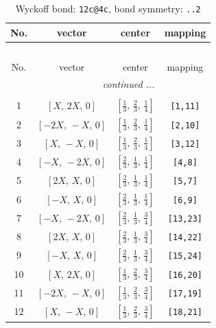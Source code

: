 \documentclass[fleqn,8pt]{jsarticle}
\begin{document}
\renewcommand{\arraystretch}{1.2}
\begin{longtable}{cccc}
\caption{Wyckoff bond: {\tt 12c@4c}, bond symmetry: {\tt ..2}}
 \\
 \hline \hline
No. & vector & center & mapping \\ \hline \endfirsthead

\multicolumn{3}{l}{\tablename\ \thetable{}} \\
 \hline \hline
No. & vector & center & mapping \\ \hline \endhead

 \hline \hline
\multicolumn{3}{r}{\footnotesize\it continued ...} \\ \endfoot

 \hline \hline
\multicolumn{3}{r}{} \\ \endlastfoot

1 & $\left[ X,\, 2 X,\, 0 \right]$ & $\left[ \frac{1}{3},\, \frac{2}{3},\, \frac{1}{4} \right]$ & {\tt [1,11]} \\ \hline
2 & $\left[ - 2 X,\, - X,\, 0 \right]$ & $\left[ \frac{1}{3},\, \frac{2}{3},\, \frac{1}{4} \right]$ & {\tt [2,10]} \\ \hline
3 & $\left[ X,\, - X,\, 0 \right]$ & $\left[ \frac{1}{3},\, \frac{2}{3},\, \frac{1}{4} \right]$ & {\tt [3,12]} \\ \hline
4 & $\left[ - X,\, - 2 X,\, 0 \right]$ & $\left[ \frac{2}{3},\, \frac{1}{3},\, \frac{1}{4} \right]$ & {\tt [4,8]} \\ \hline
5 & $\left[ 2 X,\, X,\, 0 \right]$ & $\left[ \frac{2}{3},\, \frac{1}{3},\, \frac{1}{4} \right]$ & {\tt [5,7]} \\ \hline
6 & $\left[ - X,\, X,\, 0 \right]$ & $\left[ \frac{2}{3},\, \frac{1}{3},\, \frac{1}{4} \right]$ & {\tt [6,9]} \\ \hline
7 & $\left[ - X,\, - 2 X,\, 0 \right]$ & $\left[ \frac{2}{3},\, \frac{1}{3},\, \frac{3}{4} \right]$ & {\tt [13,23]} \\ \hline
8 & $\left[ 2 X,\, X,\, 0 \right]$ & $\left[ \frac{2}{3},\, \frac{1}{3},\, \frac{3}{4} \right]$ & {\tt [14,22]} \\ \hline
9 & $\left[ - X,\, X,\, 0 \right]$ & $\left[ \frac{2}{3},\, \frac{1}{3},\, \frac{3}{4} \right]$ & {\tt [15,24]} \\ \hline
10 & $\left[ X,\, 2 X,\, 0 \right]$ & $\left[ \frac{1}{3},\, \frac{2}{3},\, \frac{3}{4} \right]$ & {\tt [16,20]} \\ \hline
11 & $\left[ - 2 X,\, - X,\, 0 \right]$ & $\left[ \frac{1}{3},\, \frac{2}{3},\, \frac{3}{4} \right]$ & {\tt [17,19]} \\ \hline
12 & $\left[ X,\, - X,\, 0 \right]$ & $\left[ \frac{1}{3},\, \frac{2}{3},\, \frac{3}{4} \right]$ & {\tt [18,21]} \\
\end{longtable}
\end{document}
